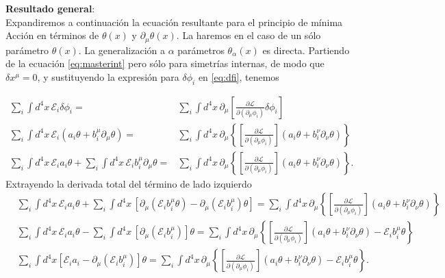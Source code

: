 \textbf{Resultado general}:\\
\noindent
Expandiremos a continuación la ecuación resultante para el principio de mínima Acción en términos de $\theta(x)$ y $\partial_\mu\theta(x)$.
La haremos en el caso de un sólo parámetro $\theta(x)$. La generalización a $\alpha$ parámetros $\theta_{\alpha}(x)$ es directa. Partiendo de la ecuación \eqref{eq:masterint} pero sólo para simetrías internas, de modo que $\delta x^{\mu}=0$, y sustituyendo la expresión para $\delta\phi_i$ en \eqref{eq:dfi}, tenemos
\begin{frame}
\begin{align}
    \sum_i\int {d^4}x\, \mathcal{E}_i \delta\phi_i = & \sum_{i}\int {d^4}x\, \partial_{\mu} \left[  \frac{\partial\mathcal{L}}{\partial(\partial_{\mu}\phi_i)}\delta\phi_i \right]\nonumber\\
      \sum_i \int {d^4}x\, \mathcal{E}_i \left( a_i \theta +b^{\mu}_i \partial_{\mu}\theta \right) =&  \sum_i \int {d^4}x\, \partial_{\mu} \left\{ \left[ \frac{\partial\mathcal{L}}{\partial(\partial_{\mu}\phi_i)}\right] \left( a_i \theta +b^{\nu}_i \partial_{\nu}\theta \right)  \right\}\nonumber\\
      \sum_i \int {d^4}x\, \mathcal{E}_ia_i \theta+\sum_i \int {d^4}x\, \mathcal{E}_i b^{\mu}_i \partial_{\mu}\theta  =&  \sum_i \int {d^4}x\, \partial_{\mu} \left\{ \left[ \frac{\partial\mathcal{L}}{\partial(\partial_{\mu}\phi_i)}\right] \left( a_i \theta +b^{\nu}_i \partial_{\nu}\theta \right)  \right\}.
\end{align}
Extrayendo la derivada total del término de lado izquierdo 
\begin{align}
\label{eq:tn1}
   &   \sum_i \int {d^4}x\, \mathcal{E}_ia_i \theta+\sum_i \int {d^4}x\, \left[ \partial_{\mu} \left(  \mathcal{E}_i b^{\mu}_i \theta \right)-\partial_{\mu} \left(  \mathcal{E}_i b^{\mu}_i  \right) \theta \right]  =  \sum_i \int {d^4}x\, \partial_{\mu} \left\{ \left[ \frac{\partial\mathcal{L}}{\partial(\partial_{\mu}\phi_i)}\right] \left( a_i \theta +b^{\nu}_i \partial_{\nu}\theta \right)  \right\}\nonumber\\
&        \sum_i \int {d^4}x\, \mathcal{E}_ia_i \theta-\sum_i \int {d^4}x\, \left[ \partial_{\mu}   \left(  \mathcal{E}_i b^{\mu}_i  \right) \right] \theta   =  \sum_i \int {d^4}x\, \partial_{\mu} \left\{ \left[ \frac{\partial\mathcal{L}}{\partial(\partial_{\mu}\phi_i)}\right] \left( a_i \theta +b^{\nu}_i \partial_{\nu}\theta \right) -\mathcal{E}_i b^{\mu}_i \theta  \right\} \nonumber\\
&        \sum_i\int {d^4}x \left[ \mathcal{E}_ia_i -  \partial_{\mu}   \left(  \mathcal{E}_i b^{\mu}_i  \right) \right]  \theta   =  \sum_i \int {d^4}x\, \partial_{\mu} \left\{ \left[ \frac{\partial\mathcal{L}}{\partial(\partial_{\mu}\phi_i)}\right] \left( a_i \theta +b^{\nu}_i \partial_{\nu}\theta \right) -\mathcal{E}_i b^{\mu}_i \theta  \right\}.
\end{align}
\end{frame}

